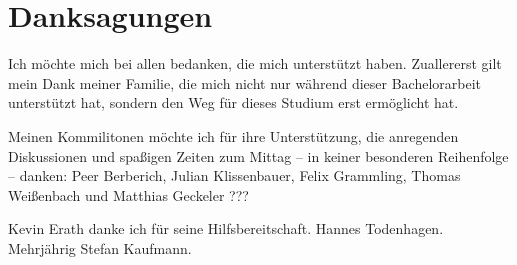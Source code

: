 
\chapter*{Danksagungen}

Ich möchte mich bei allen bedanken, die mich unterstützt haben.
Zuallererst gilt mein Dank meiner Familie, die mich nicht nur während dieser Bachelorarbeit unterstützt hat, sondern den Weg für dieses Studium erst ermöglicht hat.

Meinen Kommilitonen möchte ich für ihre Unterstützung, die anregenden Diskussionen und spaßigen Zeiten zum Mittag -- in keiner besonderen Reihenfolge -- danken:
Peer Berberich,
Julian Klissenbauer,
Felix Grammling,
Thomas Weißenbach
und
Matthias Geckeler
???

Kevin Erath danke ich für seine  Hilfsbereitschaft. Hannes Todenhagen.
Mehrjährig Stefan Kaufmann.







